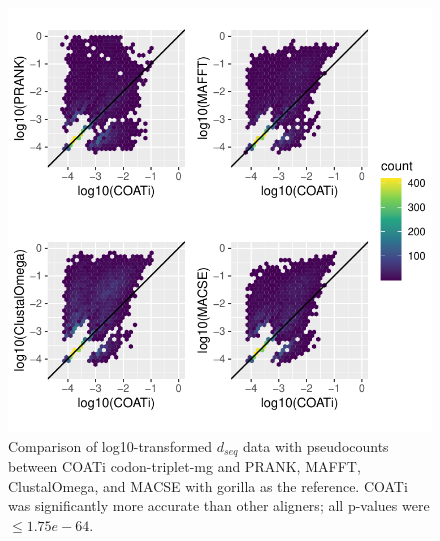 \documentclass[
]{article}
\begin{document}
\begin{figure}

{\centering \includegraphics{figures/dseq_plots_reverse} 

}

\caption{\label{fig:dseq-reverse} Comparison of log10-transformed $d_{seq}$ data with pseudocounts between COATi codon-triplet-mg and PRANK, MAFFT, ClustalOmega, and MACSE with gorilla as the reference. COATi was significantly more accurate than other aligners; all p-values were $\leq 1.75e-64$.}\label{fig:dseq5}
\end{figure}

\newpage
\end{document}
